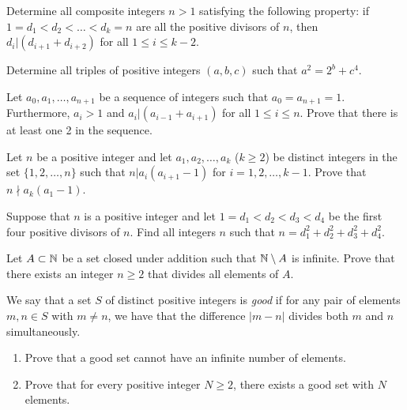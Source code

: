 \documentclass[12pt]{memoir}
\begin{document}
\begin{Ej}
Determine all composite integers \(n > 1\) satisfying the following property: if \(1 = d_1 < d_2 < \dots < d_k = n\) are all the positive divisors of \(n\), then \(d_i | (d_{i+1} + d_{i+2})\) for all \(1 \leq i \leq k - 2\).
\end{Ej}

\begin{Ej}
Determine all triples of positive integers \((a, b, c)\) such that \(a^2 = 2^b + c^4\).
\end{Ej}

\begin{Ej}
Let \(a_0, a_1, \dots, a_{n+1}\) be a sequence of integers such that \(a_0 = a_{n+1} = 1\). Furthermore, \(a_i > 1\) and \(a_i | (a_{i-1} + a_{i+1})\) for all \(1 \leq i \leq n\). Prove that there is at least one 2 in the sequence.
\end{Ej}

\begin{Ej}
Let \(n\) be a positive integer and let \(a_1, a_2, \dots, a_k\) (\(k \geq 2\)) be distinct integers in the set \(\{1, 2, \dots, n\}\) such that \(n | a_i(a_{i+1} - 1)\) for \(i = 1, 2, \dots, k - 1\). Prove that \(n \nmid a_k(a_1 - 1)\).
\end{Ej}

\begin{Ej}
Suppose that \(n\) is a positive integer and let \(1 = d_1 < d_2 < d_3 < d_4\) be the first four positive divisors of \(n\). Find all integers \(n\) such that \(n = d_1^2 + d_2^2 + d_3^2 + d_4^2\).
\end{Ej}

\begin{Ej}
Let \(A \subset \mathbb{N}\) be a set closed under addition such that \(\mathbb{N} \setminus A\) is infinite. Prove that there exists an integer \(n \geq 2\) that divides all elements of \(A\).
\end{Ej}

\begin{Ej}
We say that a set \(S\) of distinct positive integers is \emph{good} if for any pair of elements \(m, n \in S\) with \(m \neq n\), we have that the difference \(|m - n|\) divides both \(m\) and \(n\) simultaneously.
\begin{enumerate}[label=\alph*)]
    \item Prove that a good set cannot have an infinite number of elements.
    \item Prove that for every positive integer \(N \geq 2\), there exists a good set with \(N\) elements.
\end{enumerate}
\end{Ej}
\end{document}
